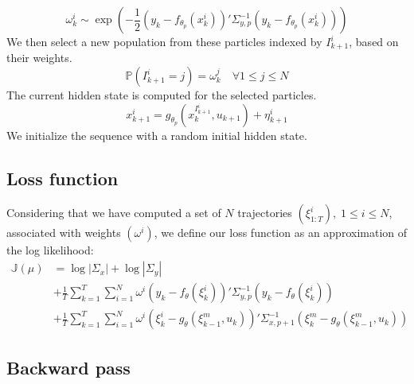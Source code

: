 \documentclass[10pt,a4paper]{report}
\begin{document}
$$\omega_k^i \sim \exp(-\frac{1}{2}(y_k - f_{\theta_p}(x_k^i))'\Sigma^{-1}_{y, p}(y_k - f_{\theta_p}(x_k^i)))$$
We then select a new population from these particles indexed by $I_{k+1}^i$, based on their weights.
$$\mathbb{P}(I_{k+1}^i=j) = \omega_k^j \quad \forall 1 \leq j \leq N$$
The current hidden state is computed for the selected particles.
$$x^i_{k+1} = g_{\theta_p}(x_k^{I_{k+1}^i}, u_{k+1}) + \eta^i_{k+1}$$
We initialize the sequence with a random initial hidden state.

\subsection{Loss function}
Considering that we have computed a set of $N$ trajectories $(\xi^i_{1:T}),\;1 \leq i \leq N$, associated with weights $(\omega^i)$, we define our loss function as an approximation of the log likelihood:
\begin{align*}
        \mathbb{J}(\mu) & = \log |\Sigma_x| + \log |\Sigma_y|                                                                                                               \\
                        & + \frac{1}{T}\sum_{k=1}^T \sum_{i=1}^N \omega^i (y_k - f_\theta(\xi_k^i))' \Sigma_{y, p}^{-1} (y_k - f_\theta(\xi_k^i))                           \\
                        & + \frac{1}{T}\sum_{k=1}^T \sum_{i=1}^N \omega^i (\xi_k^i - g_\theta(\xi_{k-1}^m, u_k))'\Sigma_{x, p+1}^{-1}(\xi_k^m - g_\theta(\xi_{k-1}^m, u_k))
\end{align*}

\subsection{Backward pass}
\end{document}
